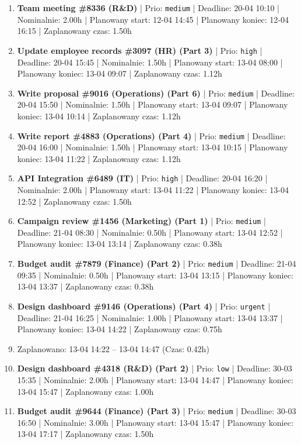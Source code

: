 {\begin{enumerate}
  \item [\textbf{14649}] \textbf{Team meeting \#8336 (R\&D)} | Prio: \texttt{medium} | Deadline: 20-04 10:10 | Nominalnie: 2.00h | Planowany start: 12-04 14:45 | Planowany koniec: 12-04 16:15 | Zaplanowany czas: 1.50h
  \item [\textbf{14621}] \textbf{Update employee records \#3097 (HR) (Part 3)} | Prio: \texttt{high} | Deadline: 20-04 15:45 | Nominalnie: 1.50h | Planowany start: 13-04 08:00 | Planowany koniec: 13-04 09:07 | Zaplanowany czas: 1.12h
  \item [\textbf{14662}] \textbf{Write proposal \#9016 (Operations) (Part 6)} | Prio: \texttt{medium} | Deadline: 20-04 15:50 | Nominalnie: 1.50h | Planowany start: 13-04 09:07 | Planowany koniec: 13-04 10:14 | Zaplanowany czas: 1.12h
  \item [\textbf{14651}] \textbf{Write report \#4883 (Operations) (Part 4)} | Prio: \texttt{medium} | Deadline: 20-04 16:00 | Nominalnie: 1.50h | Planowany start: 13-04 10:15 | Planowany koniec: 13-04 11:22 | Zaplanowany czas: 1.12h
  \item [\textbf{14620}] \textbf{API Integration \#6489 (IT)} | Prio: \texttt{high} | Deadline: 20-04 16:20 | Nominalnie: 2.00h | Planowany start: 13-04 11:22 | Planowany koniec: 13-04 12:52 | Zaplanowany czas: 1.50h
  \item [\textbf{14653}] \textbf{Campaign review \#1456 (Marketing) (Part 1)} | Prio: \texttt{medium} | Deadline: 21-04 08:30 | Nominalnie: 0.50h | Planowany start: 13-04 12:52 | Planowany koniec: 13-04 13:14 | Zaplanowany czas: 0.38h
  \item [\textbf{14644}] \textbf{Budget audit \#7879 (Finance) (Part 2)} | Prio: \texttt{medium} | Deadline: 21-04 09:35 | Nominalnie: 0.50h | Planowany start: 13-04 13:15 | Planowany koniec: 13-04 13:37 | Zaplanowany czas: 0.38h
  \item [\textbf{14606}] \textbf{Design dashboard \#9146 (Operations) (Part 4)} | Prio: \texttt{urgent} | Deadline: 21-04 16:25 | Nominalnie: 1.00h | Planowany start: 13-04 13:37 | Planowany koniec: 13-04 14:22 | Zaplanowany czas: 0.75h
  \item [\textbf{PRZERWA}] Zaplanowano: 13-04 14:22 -- 13-04 14:47 (Czas: 0.42h)
  \item [\textbf{14691}] \textbf{Design dashboard \#4318 (R\&D) (Part 2)} | Prio: \texttt{low} | Deadline: 30-03 15:35 | Nominalnie: 2.00h | Planowany start: 13-04 14:47 | Planowany koniec: 13-04 15:47 | Zaplanowany czas: 1.00h
  \item [\textbf{14659}] \textbf{Budget audit \#9644 (Finance) (Part 3)} | Prio: \texttt{medium} | Deadline: 30-03 16:50 | Nominalnie: 3.00h | Planowany start: 13-04 15:47 | Planowany koniec: 13-04 17:17 | Zaplanowany czas: 1.50h

\end{enumerate}}
